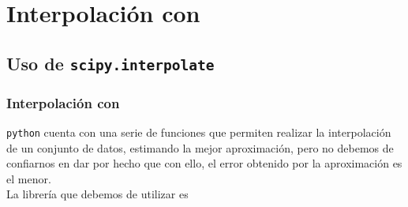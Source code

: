 {
\section{Interpolación con \python}
\subsection{Uso de \texttt{scipy.interpolate}}
\begin{frame}
\frametitle{Interpolación con \python}
\texttt{python} cuenta con una serie de funciones que permiten realizar la interpolación de un conjunto de datos, estimando la mejor aproximación, pero no debemos de confiarnos en dar por hecho que con ello, el error obtenido por la aproximación es el menor.
\\
\bigskip
\pause
La librería que debemos de utilizar es 
\end{frame}
}
